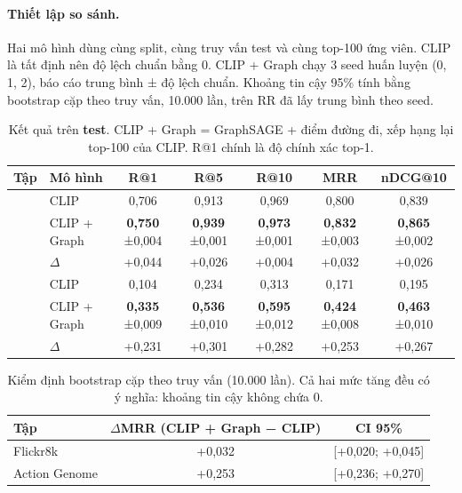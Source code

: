 \documentclass[11pt,a4paper]{article}
\newcommand{\pos}[1]{\textcolor{good}{#1}}
\begin{document}
\paragraph{Thiết lập so sánh.} Hai mô hình dùng cùng split, cùng truy vấn test và cùng top-100 ứng viên. CLIP là tất định nên độ lệch chuẩn bằng 0. CLIP + Graph chạy 3 seed huấn luyện (0, 1, 2), báo cáo trung bình ± độ lệch chuẩn. Khoảng tin cậy 95\% tính bằng bootstrap cặp theo truy vấn, 10.000 lần, trên RR đã lấy trung bình theo seed.

\begin{table}[H]
\centering\small
\setlength{\tabcolsep}{5pt}
\begin{tabular}{llccccc}
\toprule
\textbf{Tập} & \textbf{Mô hình} & \textbf{R@1} & \textbf{R@5} & \textbf{R@10} & \textbf{MRR} & \textbf{nDCG@10} \\
\midrule
{}
 & CLIP & 0,706 & 0,913 & 0,969 & 0,800 & 0,839 \\
 & CLIP + Graph & \textbf{0,750} \scriptsize{±0,004} & \textbf{0,939} \scriptsize{±0,001} & \textbf{0,973} \scriptsize{±0,001} & \textbf{0,832} \scriptsize{±0,003} & \textbf{0,865} \scriptsize{±0,002} \\
 & \(\Delta\) & \pos{+0,044} & \pos{+0,026} & \pos{+0,004} & \pos{+0,032} & \pos{+0,026} \\
\midrule
{}
 & CLIP & 0,104 & 0,234 & 0,313 & 0,171 & 0,195 \\
 & CLIP + Graph & \textbf{0,335} \scriptsize{±0,009} & \textbf{0,536} \scriptsize{±0,010} & \textbf{0,595} \scriptsize{±0,012} & \textbf{0,424} \scriptsize{±0,008} & \textbf{0,463} \scriptsize{±0,010} \\
 & \(\Delta\) & \pos{+0,231} & \pos{+0,301} & \pos{+0,282} & \pos{+0,253} & \pos{+0,267} \\
\bottomrule
\end{tabular}
\caption{Kết quả trên \textbf{test}. CLIP + Graph = GraphSAGE + điểm đường đi, xếp hạng lại top-100 của CLIP. R@1 chính là độ chính xác top-1.}
\label{tab:main}
\end{table}

\begin{table}[H]
\centering\small
\begin{tabular}{lcc}
\toprule
\textbf{Tập} & \(\Delta\)\textbf{MRR} (CLIP + Graph − CLIP) & \textbf{CI 95\%} \\
\midrule
Flickr8k & \pos{+0,032} & [+0,020; +0,045] \\
Action Genome & \pos{+0,253} & [+0,236; +0,270] \\
\bottomrule
\end{tabular}
\caption{Kiểm định bootstrap cặp theo truy vấn (10.000 lần). Cả hai mức tăng đều có ý nghĩa: khoảng tin cậy không chứa 0.}
\label{tab:paired}
\end{table}
\end{document}
